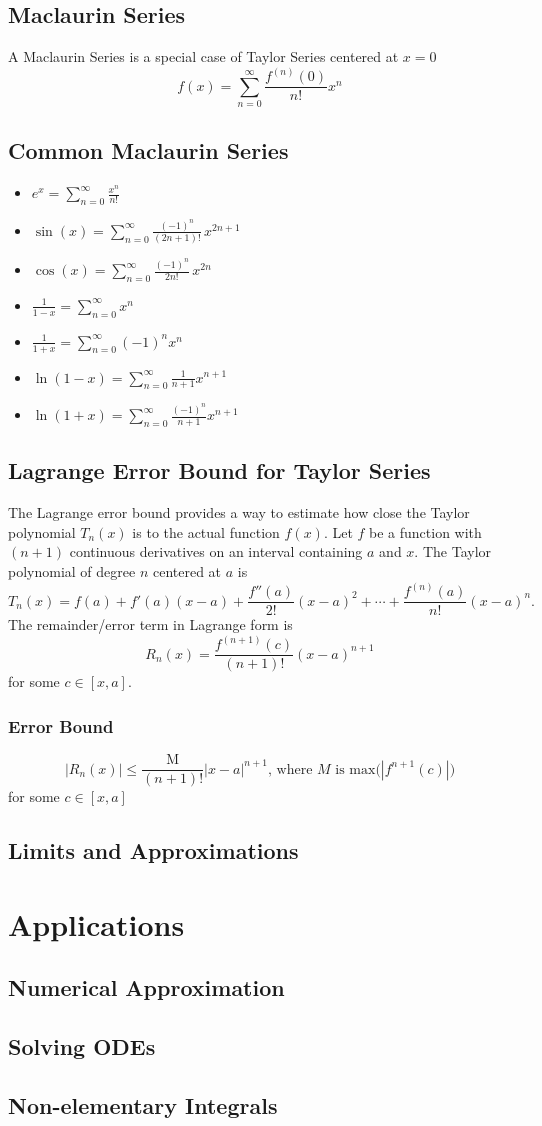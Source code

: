 \documentclass[11pt]{article}
\begin{document}
\subsection{Maclaurin Series}
A Maclaurin Series is a special case of Taylor Series centered at $x=0$
\[
  f(x) = \sum_{n=0}^{\infty} \frac{f^{(n)}(0)}{n!} x^n
\]
\subsection{Common Maclaurin Series}
\begin{itemize}
  \item$\displaystyle e^x = \sum_{n=0}^\infty \frac{x^n}{n!}$
  \item$\displaystyle \sin(x) = \sum_{n=0}^\infty \frac{(-1)^n}{(2n+1)!}\,x^{2n+1}$
  \item$\displaystyle \cos(x) = \sum_{n=0}^\infty \frac{(-1)^n}{2n!}\,x^{2n}$
  \item$\displaystyle \frac{1}{1-x} = \sum_{n=0}^\infty x^n$
  \item$\displaystyle \frac{1}{1+x} = \sum_{n=0}^\infty (-1)^nx^n$
  \item$\displaystyle \ln(1-x) = \sum_{n=0}^\infty \frac{1}{n+1}x^{n+1}$
  \item$\displaystyle \ln(1+x) = \sum_{n=0}^\infty \frac{(-1)^n}{n+1}x^{n+1}$
\end{itemize}
\subsection{Lagrange Error Bound for Taylor Series}
The Lagrange error bound provides a way to estimate how close the Taylor polynomial $T_n(x)$ is to the actual function $f(x)$.  
Let $f$ be a function with $(n+1)$ continuous derivatives on an interval containing $a$ and $x$. The Taylor polynomial of degree $n$ centered at $a$ is
\[
T_n(x) = f(a) + f'(a)(x-a) + \frac{f''(a)}{2!}(x-a)^2 + \cdots + \frac{f^{(n)}(a)}{n!}(x-a)^n.
\]
The remainder/error term in Lagrange form is
\[
  R_n(x) = \frac{f^{(n+1)}(c)}{(n+1)!}(x-a)^{n+1}
\]
for some $c\in[x,a]$.
\subsubsection*{Error Bound}
\[
  |R_n(x)| \le \frac{\text{M}}{(n+1)!} |x-a|^{n+1}\text{, where }M\text{ is max(}|f^{n+1}(c)|\text{)}
\]for some $c\in[x,a]$
\subsection{Limits and Approximations}
\section{Applications}
\subsection{Numerical Approximation}
\subsection{Solving ODEs}
\subsection{Non-elementary Integrals}
\end{document}
